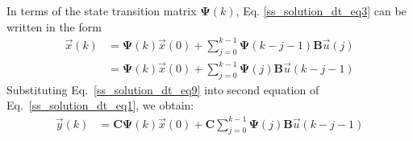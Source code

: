 \documentclass[12pt,a4paper,oneside]{book}
\begin{document}
\begin{onehalfspace}
In terms of the state transition matrix $\mathbf{\Psi}(k)$, Eq. 
\ref{ss_solution_dt_eq3} can be 
written in the form
\begin{equation}\label{ss_solution_dt_eq9}
	\begin{aligned}
		\vec{x}(k) &= 
		\mathbf{\Psi}(k)\vec{x}(0)+\sum_{j=0}^{k-1}\mathbf{\Psi}(k-j-1)\mathbf{B}\vec{u}(j)
		 \\[6pt]
		&=\mathbf{\Psi}(k)\vec{x}(0)+\sum_{j=0}^{k-1}\mathbf{\Psi}(j)\mathbf{B}\vec{u}(k-j-1)
	\end{aligned}
\end{equation}
Substituting Eq.~\eqref{ss_solution_dt_eq9} into second equation of 
Eq.~\eqref{ss_solution_dt_eq1}, we obtain:
\begin{equation}\label{ss_solution_dt_eq10}
	\begin{aligned}
		\vec{y}(k) &= 
		\mathbf{C}\mathbf{\Psi}(k)\vec{x}(0)+\mathbf{C}\sum_{j=0}^{k-1}\mathbf{\Psi}(j)\mathbf{B}\vec{u}(k-j-1)
	\end{aligned}
\end{equation}


\end{onehalfspace}
\end{document}
